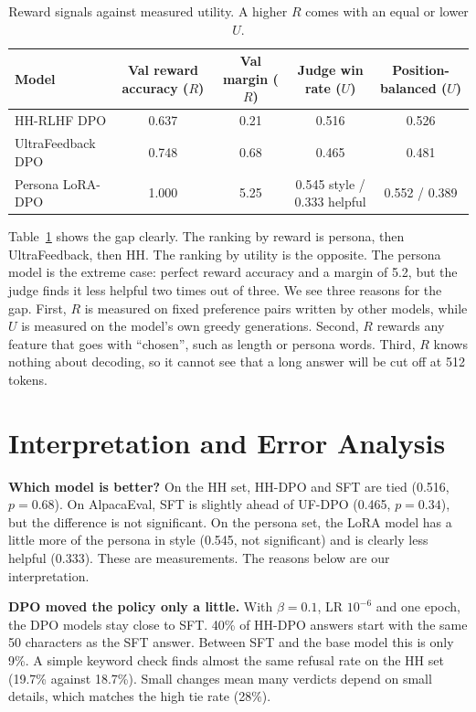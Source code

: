 \documentclass[10pt]{article}
\begin{document}
\begin{table}[h]
\centering\footnotesize
\begin{tabular}{l c c c c}
\toprule
Model & Val reward accuracy ($R$) & Val margin ($R$) & Judge win rate ($U$) & Position-balanced ($U$) \\
\midrule
HH-RLHF DPO & 0.637 & 0.21 & 0.516 & 0.526 \\
UltraFeedback DPO & 0.748 & 0.68 & 0.465 & 0.481 \\
Persona LoRA-DPO & 1.000 & 5.25 & 0.545 style / 0.333 helpful & 0.552 / 0.389 \\
\bottomrule
\end{tabular}
\caption{Reward signals against measured utility. A higher $R$ comes with an equal or lower $U$.}
\label{tab:reward}
\end{table}

Table~\ref{tab:reward} shows the gap clearly. The ranking by reward is persona, then UltraFeedback, then HH. The
ranking by utility is the opposite. The persona model is the extreme case: perfect reward accuracy and a margin of
5.2, but the judge finds it less helpful two times out of three. We see three reasons for the gap. First, $R$ is
measured on fixed preference pairs written by other models, while $U$ is measured on the model's own greedy
generations. Second, $R$ rewards any feature that goes with ``chosen'', such as length or persona words. Third, $R$
knows nothing about decoding, so it cannot see that a long answer will be cut off at 512 tokens.

\section{Interpretation and Error Analysis}
\textbf{Which model is better?} On the HH set, HH-DPO and SFT are tied (0.516, $p=0.68$). On AlpacaEval, SFT is
slightly ahead of UF-DPO (0.465, $p=0.34$), but the difference is not significant. On the persona set, the LoRA model
has a little more of the persona in style (0.545, not significant) and is clearly less helpful (0.333). These are
measurements. The reasons below are our interpretation.

\textbf{DPO moved the policy only a little.} With $\beta=0.1$, LR $10^{-6}$ and one epoch, the DPO models stay close
to SFT. 40\% of HH-DPO answers start with the same 50 characters as the SFT answer. Between SFT and the base model this
is only 9\%. A simple keyword check finds almost the same refusal rate on the HH set (19.7\% against 18.7\%). Small changes mean many verdicts depend
on small details, which matches the high tie rate (28\%).
\end{document}
